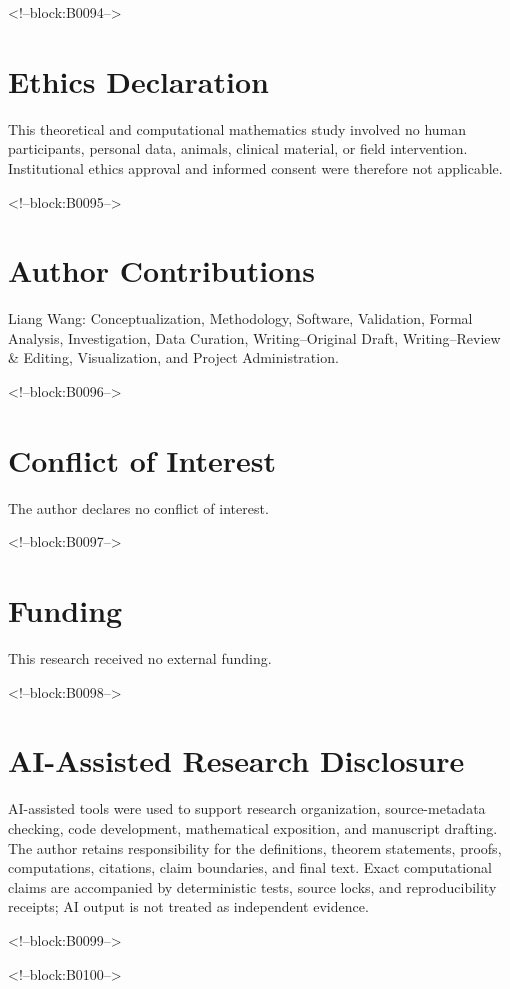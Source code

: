 \documentclass[11pt]{article}
\theoremstyle{definition}
\theoremstyle{remark}
\begin{document}
<!--block:B0094-->
\section*{Ethics Declaration}
This theoretical and computational mathematics study involved no human participants, personal data, animals, clinical material, or field intervention. Institutional ethics approval and informed consent were therefore not applicable.

<!--block:B0095-->
\section*{Author Contributions}
Liang Wang: Conceptualization, Methodology, Software, Validation, Formal Analysis, Investigation, Data Curation, Writing--Original Draft, Writing--Review \& Editing, Visualization, and Project Administration.

<!--block:B0096-->
\section*{Conflict of Interest}
The author declares no conflict of interest.

<!--block:B0097-->
\section*{Funding}
This research received no external funding.

<!--block:B0098-->
\section*{AI-Assisted Research Disclosure}
AI-assisted tools were used to support research organization, source-metadata checking, code development, mathematical exposition, and manuscript drafting. The author retains responsibility for the definitions, theorem statements, proofs, computations, citations, claim boundaries, and final text. Exact computational claims are accompanied by deterministic tests, source locks, and reproducibility receipts; AI output is not treated as independent evidence.

<!--block:B0099-->



<!--block:B0100-->
\end{document}
